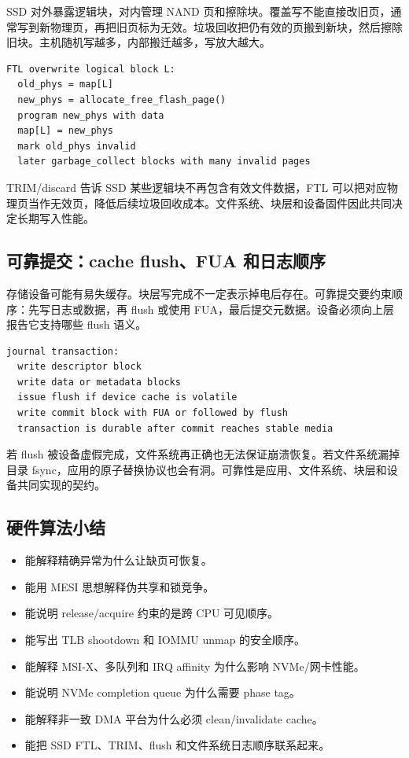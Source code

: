 SSD 对外暴露逻辑块，对内管理 NAND 页和擦除块。覆盖写不能直接改旧页，通常写到新物理页，再把旧页标为无效。垃圾回收把仍有效的页搬到新块，然后擦除旧块。主机随机写越多，内部搬迁越多，写放大越大。

\begin{lstlisting}
FTL overwrite logical block L:
  old_phys = map[L]
  new_phys = allocate_free_flash_page()
  program new_phys with data
  map[L] = new_phys
  mark old_phys invalid
  later garbage_collect blocks with many invalid pages
\end{lstlisting}

TRIM/discard 告诉 SSD 某些逻辑块不再包含有效文件数据，FTL 可以把对应物理页当作无效页，降低后续垃圾回收成本。文件系统、块层和设备固件因此共同决定长期写入性能。

\subsection{可靠提交：cache flush、FUA 和日志顺序}

存储设备可能有易失缓存。块层写完成不一定表示掉电后存在。可靠提交要约束顺序：先写日志或数据，再 flush 或使用 FUA，最后提交元数据。设备必须向上层报告它支持哪些 flush 语义。

\begin{lstlisting}
journal transaction:
  write descriptor block
  write data or metadata blocks
  issue flush if device cache is volatile
  write commit block with FUA or followed by flush
  transaction is durable after commit reaches stable media
\end{lstlisting}

若 flush 被设备虚假完成，文件系统再正确也无法保证崩溃恢复。若文件系统漏掉目录 fsync，应用的原子替换协议也会有洞。可靠性是应用、文件系统、块层和设备共同实现的契约。

\subsection{硬件算法小结}

\begin{rubricbox}
\begin{itemize}
\tightlist
\item 能解释精确异常为什么让缺页可恢复。
\item 能用 MESI 思想解释伪共享和锁竞争。
\item 能说明 release/acquire 约束的是跨 CPU 可见顺序。
\item 能写出 TLB shootdown 和 IOMMU unmap 的安全顺序。
\item 能解释 MSI-X、多队列和 IRQ affinity 为什么影响 NVMe/网卡性能。
\item 能说明 NVMe completion queue 为什么需要 phase tag。
\item 能解释非一致 DMA 平台为什么必须 clean/invalidate cache。
\item 能把 SSD FTL、TRIM、flush 和文件系统日志顺序联系起来。
\end{itemize}
\end{rubricbox}
